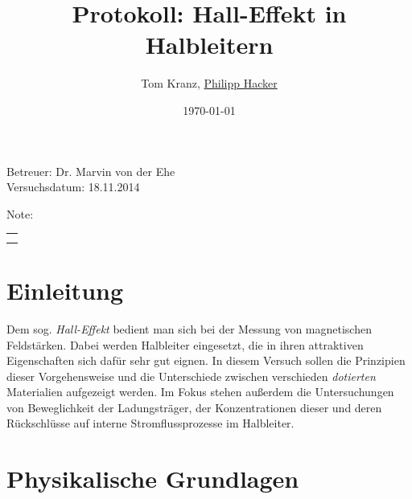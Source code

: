 \documentclass[numbers=noenddot,14pt,a4paper]{scrartcl}
\title{Protokoll: Hall-Effekt in Halbleitern} %
\author{Tom Kranz, \underline{Philipp Hacker}}
\date{\today}
\newcommand{\tilt}[1]{\textit{#1}}
\begin{document}
\maketitle
\begin{center}
Betreuer: Dr. Marvin von der Ehe\\ %
Versuchsdatum: 18.11.2014\\ %
\begin{table}[h]
\centering
Note: %
\begin{tabularx}{1.5cm}{|X|}
\hline \\ \\
\hline
\end{tabularx}
\end{table}
\end{center}
\vspace*{\fill}
\tableofcontents
\vfill
\newpage
\section{Einleitung}
Dem sog. \tilt{Hall-Effekt} bedient man sich bei der Messung von magnetischen Feldstärken. Dabei werden Halbleiter eingesetzt, die in ihren attraktiven Eigenschaften sich dafür sehr gut eignen. In diesem Versuch sollen die Prinzipien dieser Vorgehensweise und die Unterschiede zwischen verschieden \tilt{dotierten} Materialien aufgezeigt werden. Im Fokus stehen außerdem die Untersuchungen von Beweglichkeit der Ladungsträger, der Konzentrationen dieser und deren Rückschlüsse auf interne Stromflussprozesse im Halbleiter.
\section{Physikalische Grundlagen}
\end{document}
